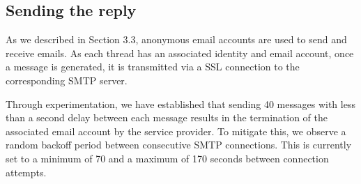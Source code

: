 \subsection{Sending the reply}
As we described in Section 3.3, anonymous email accounts are used to send and receive emails. As each thread has an associated identity and email account, once a message is generated, it is transmitted via a SSL connection to the corresponding SMTP server.

Through experimentation, we have established that sending 40 messages with less than a second delay between each message results in the termination of the associated email account by the service provider. To mitigate this, we observe a random backoff period between consecutive SMTP connections. This is currently set to a minimum of 70 and a maximum of 170 seconds between connection attempts.

